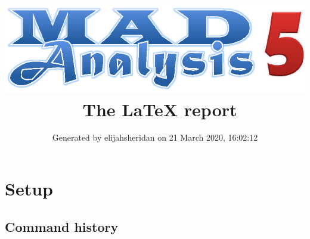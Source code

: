 \documentclass[a4paper, 10pt]{article}
\title{{\includegraphics[scale=.4]{logo.eps}}\ The LaTeX report}
\author{Generated by elijahsheridan on 21 March 2020, 16:02:12}
\begin{document}
\maketitle
\flushbottom

\newpage
\section{ Setup}

\subsection{ Command history}
\end{document}
